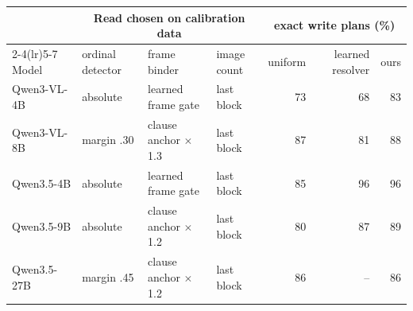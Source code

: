 \begin{tabular}{llllrrr}
\toprule
& \multicolumn{3}{c}{Read chosen on calibration data} & \multicolumn{3}{c}{exact write plans (\%)} \\
\cmidrule(lr){2-4}\cmidrule(lr){5-7}
Model & ordinal detector & frame binder & image count & uniform & learned resolver & ours \\
\midrule
Qwen3-VL-4B & absolute & learned frame gate & last block & 73 & 68 & 83 \\
Qwen3-VL-8B & margin .30 & clause anchor $\times$1.3 & last block & 87 & 81 & 88 \\
Qwen3.5-4B & absolute & learned frame gate & last block & 85 & 96 & 96 \\
Qwen3.5-9B & absolute & clause anchor $\times$1.2 & last block & 80 & 87 & 89 \\
Qwen3.5-27B & margin .45 & clause anchor $\times$1.2 & last block & 86 & -- & 86 \\
\bottomrule
\end{tabular}
